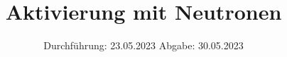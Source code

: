 

%

\subject{V702}
\title{Aktivierung mit Neutronen}
\date{%
  Durchführung: 23.05.2023
  \hspace{3em}
  Abgabe: 30.05.2023
}


\setlength{\parindent}{0pt} %

\maketitle
\thispagestyle{empty}
\tableofcontents
\newpage



%
%


\printbibliography{}




